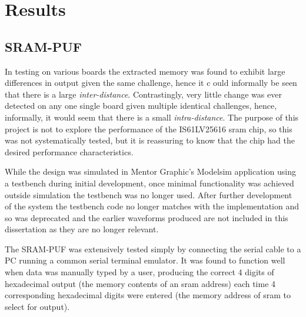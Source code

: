 
\chapter{Results} %

\label{ch:results} %


\section{SRAM-PUF}

In testing on various boards the extracted memory was found to exhibit large
differences in output given the same challenge, hence it c
ould informally be seen that there is a large \emph{inter-distance}.
Contrastingly, very little change was ever detected on any one single board
given multiple identical challenges, hence, informally, it would seem that
there is a small \emph{intra-distance}. The purpose of this project is
not to explore the performance of the IS61LV25616 \gls{sram} chip, so this was
not systematically tested, but it is reassuring to know that the chip had the
desired performance characteristics.

While the design was simulated in Mentor Graphic's Modelsim application using a testbench
during initial development, once
minimal functionality was achieved outside simulation the testbench was no longer
used. After further development of the system the testbench code no longer matches
with the implementation and so was deprecated and the earlier waveforms produced
are not included in this dissertation as they are no longer relevant.

The SRAM-PUF was extensively tested simply by connecting the serial cable to a
PC running a common serial terminal emulator. It was found to function well when
data was manually typed by a user, producing the correct 4 digits of hexadecimal
output (the memory contents of an \gls{sram} address) each time 4 corresponding hexadecimal digits
were entered (the memory address of \gls{sram} to select for output).

